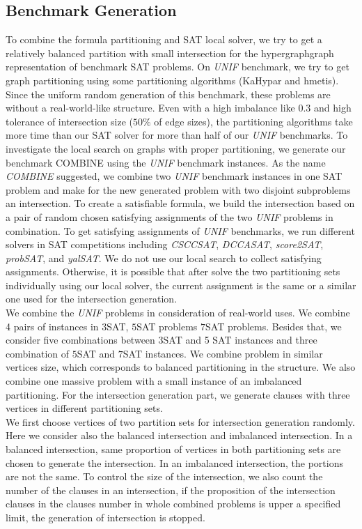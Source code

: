 \documentclass[12pt,a4paper,twoside]{scrartcl}
\numberwithin{equation}{section}
\begin{document}
\subsection{Benchmark Generation}
To combine the formula partitioning and SAT local solver, we try to get a relatively balanced partition with small intersection for the hypergraphgraph representation of benchmark SAT problems.  On  \emph{UNIF} benchmark, we try to get graph partitioning using some partitioning algorithms (KaHypar and hmetis). Since the uniform random generation of this benchmark, these problems are without a real-world-like structure. Even with a high imbalance like $0.3$ and high tolerance of intersection size ($50\%$ of edge sizes), the partitioning algorithms take more time than our SAT solver for more than half of our  \emph{UNIF} benchmarks.  To investigate the local search on graphs with proper partitioning, we generate our benchmark COMBINE  using the  \emph{UNIF} benchmark instances.  As the name \emph{COMBINE} suggested, we combine two \emph{UNIF} benchmark instances in one SAT problem and make for the new generated problem with two disjoint subproblems an intersection.  To create a satisfiable formula, we build the intersection based on a pair of random chosen satisfying assignments of the two \emph{UNIF} problems in combination. To get satisfying assignments of  \emph{UNIF} benchmarks, we run different solvers in SAT competitions including \emph{CSCCSAT}, \emph{DCCASAT}, \emph{score2SAT}, \emph{probSAT}, and \emph{yalSAT}. We do not use our local search to collect satisfying assignments. Otherwise, it is possible that after solve the two partitioning sets individually using our local solver, the current assignment is the same or a similar one used for the intersection generation.\\
We combine the \emph{UNIF} problems in consideration of real-world uses. 
We combine 4  pairs of instances in  $3$SAT, $5$SAT problems $7$SAT problems. Besides that, we consider five combinations between  3SAT and 5 SAT instances and three combination of $5$SAT and $7$SAT instances. 
We combine problem in similar vertices size, which corresponds to balanced partitioning in the structure. We also combine one massive problem with a small instance of an imbalanced partitioning. For the intersection generation part, we generate clauses with three vertices in different partitioning sets. \\
We first choose vertices of two partition sets for intersection generation randomly. Here we consider also the balanced intersection and imbalanced intersection. In a balanced intersection, same proportion of vertices in both partitioning sets are chosen to generate the intersection. In an imbalanced intersection, the portions are not the same.  To control the size of the intersection, we also count the number of the clauses in an intersection, if the proposition of the intersection clauses in the clauses number in whole combined problems is upper a specified limit, the generation of intersection is stopped.
\end{document}
